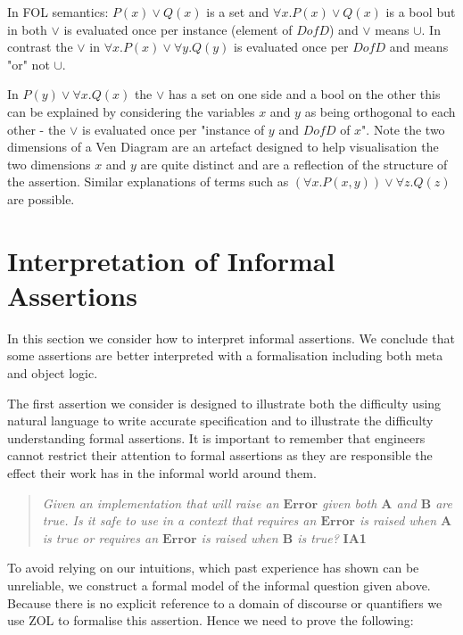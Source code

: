 In  FOL semantics: $P(x)\vee Q(x)$  is a set and $\forall x. P(x)\vee Q(x)$ is a bool but in both $\vee$ is evaluated once per instance (element of $DofD$) and  $\vee$ means $\cup$. In contrast  the $\vee$ in $\forall x. P(x)\vee \forall y. Q(y)$ is evaluated once per $DofD$ and means "or" not $\cup$.
 
In   $P(y)\vee \forall x. Q(x)$  the $\vee$ has a set on one side and a bool on the other  this can be explained by considering the variables $x$ and $y$ as being orthogonal to each other - the $\vee$ is evaluated once per "instance of $y$ and $DofD$ of $x$". Note the two dimensions of a Ven Diagram are an artefact designed to help visualisation the two dimensions $x$ and $y$ are quite distinct and are a reflection of the structure of the assertion.
Similar explanations of terms such as   $(\forall x. P(x,y))\vee \forall z. Q(z)$  are possible.


 
 
\section{Interpretation of Informal Assertions} \label{sec:MetaOr}
In this section we consider how to interpret informal assertions. We conclude that some assertions are better interpreted with a formalisation including both meta and object logic.

 The first assertion we consider is designed to illustrate both the difficulty using natural language to write accurate specification and to illustrate the difficulty understanding formal assertions. It is important to remember that engineers cannot restrict their attention to formal assertions as they are responsible the effect their work has in the informal world around them.
 

\begin{quotation}
 \emph{Given an implementation that will raise an $\mathbf{Error}$ given both $\mathbf{A}$ and $\mathbf{B}$ are true. 
Is it safe to use in a context that requires  an $\mathbf{Error}$  is raised when $\mathbf{A}$ is true or  requires  an $\mathbf{Error}$  is raised when $\mathbf{B}$ is true? }\hspace{\fill} {\bf IA1}
 \end{quotation}

  To avoid relying on our intuitions, which past experience has shown can be unreliable, we construct a formal model of  the informal question given above. 
  Because there is no explicit reference to a domain of discourse or quantifiers we use ZOL to formalise this assertion.
  Hence  we need to prove the following: 

